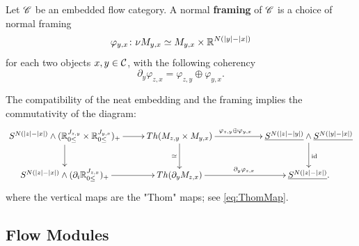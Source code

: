 
\begin{defn}\label{def:NormalFramingOfFlowCat}
Let $\mathscr{C}$ be an embedded flow category. A normal \textbf{framing} of $\mathscr{C}$ is a choice of normal framing
\begin{equation*}
    \varphi_{y,x}\colon \nu M_{y,x} \simeq M_{y,x} \times \mathbb{R}^{N(\left\lvert y\right\rvert-\left\lvert x\right\rvert)}
\end{equation*}
for each two objects $x,y \in \mathcal{C}$, with the following coherency
\begin{equation*}
    \partial_y \varphi_{z,x} = \varphi_{z,y} \oplus \varphi_{y,x}. 
\end{equation*}
\end{defn}

The compatibility of the neat embedding and the framing implies the commutativity of the diagram:
\begin{equation}\label{eq:ThomFunctoriality}
    \xymatrix{
    S^{N(\norm{z}-\norm{x})}\wedge (\Hlf^{J_{z,y}} \times \Hlf^{J_{y,x}})_+ \ar[r]\ar[d] &  Th(M_{z,y} \times M_{y,x}) \ar[rr]^{\hspace{-20pt}\varphi_{z,y}\oplus \varphi_{y,x}}\ar[d]_{\simeq} && \const{S^{N(\norm{z}-\norm{y})}} \wedge \const{S^{N(\norm{y}-\norm{x})}} \ar[d]^{\id} \\
    S^{N(\norm{z}-\norm{x})}\wedge (\partial_i \Hlf^{J_{z,x}})_+ \ar[r] & Th(\partial_y M_{z,x}) \ar[rr]^{\partial_y \varphi_{z,x}} && \const{S^{N(\norm{z}-\norm{x})}}.
    }
\end{equation}
where the vertical maps are the "Thom" maps; see \cref{eq:ThomMap}.

\subsection{Flow Modules}\label{subsec:FlowModules}

